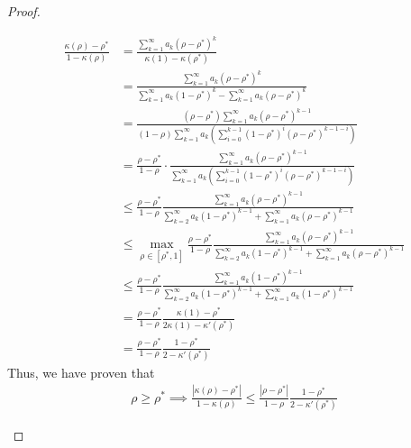 \begin{proof}
\begin{itemize}
\begin{align*}
\frac{\kappa(\rho)-\rho^*}{1-\kappa(\rho)} &= \frac{\sum_{k=1}^\infty a_k (\rho-\rho^*)^k}{\kappa(1)- \kappa(\rho^*)}\\
&= \frac{\sum_{k=1}^\infty a_k (\rho-\rho^*)^k}{\sum_{k=1}^\infty a_k (1-\rho^*)^k - \sum_{k=1}^\infty a_k (\rho-\rho^*)^k}  \\
&= \frac{(\rho-\rho^*)\sum_{k=1}^\infty a_k (\rho-\rho^*)^{k-1}}{(1-\rho)\sum_{k=1}^\infty a_k (\sum_{i=0}^{k-1}(1-\rho^*)^i(\rho-\rho^*)^{k-1-i})} \\
&= \frac{\rho-\rho^*}{1-\rho}\cdot\frac{\sum_{k=1}^\infty a_k (\rho-\rho^*)^{k-1}}{\sum_{k=1}^\infty a_k (\sum_{i=0}^{k-1}(1-\rho^*)^i(\rho-\rho^*)^{k-1-i})}\\
&\le \frac{\rho-\rho^*}{1-\rho}\frac{\sum_{k=1}^\infty a_k (\rho-\rho^*)^{k-1}}{\sum_{k=2}^\infty a_k (1-\rho^*)^{k-1} + \sum_{k=1}^\infty a_k (\rho-\rho^*)^{k-1}}\\
&\le \max_{\rho\in[\rho^*,1]}\frac{\rho-\rho^*}{1-\rho}\frac{\sum_{k=1}^\infty a_k (\rho-\rho^*)^{k-1}}{\sum_{k=2}^\infty a_k(1-\rho^*)^{k-1} + \sum_{k=1}^\infty a_k (\rho-\rho^*)^{k-1}}\\
&\le \frac{\rho-\rho^*}{1-\rho}\frac{\sum_{k=1}^\infty a_k (1-\rho^*)^{k-1}}{\sum_{k=2}^\infty a_k (1-\rho^*)^{k-1} + \sum_{k=1}^\infty a_k (1-\rho^*)^{k-1}}\\
&=\frac{\rho-\rho^*}{1-\rho}\frac{\kappa(1)-\rho^*}{2\kappa(1)-\kappa'(\rho^*)}\\
&=\frac{\rho-\rho^*}{1-\rho}\frac{1-\rho^*}{2-\kappa'(\rho^*)}
\end{align*}
Thus, we have proven that 
\begin{align*}
\rho \ge \rho^* \implies \frac{|\kappa(\rho)-\rho^*|}{1-\kappa(\rho)} \le \frac{|\rho-\rho^*|}{1-\rho} \frac{1-\rho^*}{2-\kappa'(\rho^*)}
\end{align*}



\end{itemize}
\end{proof}
